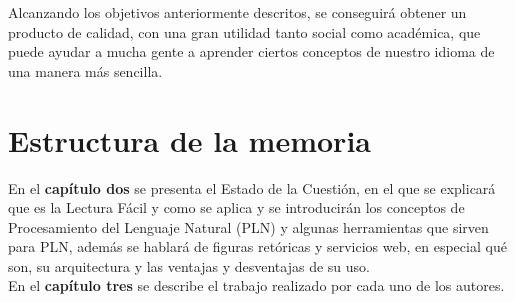 Alcanzando los objetivos anteriormente descritos, se conseguirá obtener un producto de calidad, con una gran utilidad tanto social como académica, que puede ayudar a mucha gente a aprender ciertos conceptos de nuestro idioma de una manera más sencilla.
	
	
\section{Estructura de la memoria}
\label{cap:sec:estructuramemoria}


En el \textbf{capítulo dos} se presenta el Estado de la Cuestión, en el que se explicará que es la Lectura Fácil y como se aplica y se introducirán los conceptos de Procesamiento del Lenguaje Natural (PLN) y algunas herramientas que sirven para PLN, además se hablará de figuras retóricas y servicios web, en especial qué son, su arquitectura y las ventajas y desventajas de su uso.\\


En el \textbf{capítulo tres} se describe el trabajo realizado por cada uno de los autores.
